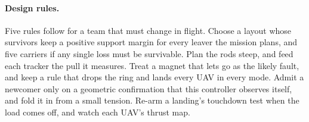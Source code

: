 %


\paragraph{Design rules.} Five rules follow for a team that must change in flight. Choose a layout whose survivors
keep a positive support margin for every leaver the mission plans, and five carriers if any single loss must be
survivable. Plan the rods steep, and feed each tracker the pull it measures. Treat a magnet that lets go as the likely
fault, and keep a rule that drops the ring and lands every UAV in every mode. Admit a newcomer only on a geometric
confirmation that this controller observes itself, and fold it in from a small tension. Re-arm a landing's touchdown
test when the load comes off, and watch each UAV's thrust map.

